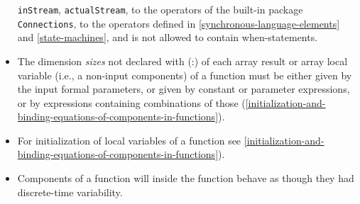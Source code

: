 \begin{itemize}
	\lstinline!inStream!, \lstinline!actualStream!,
  to the operators of the built-in package \lstinline!Connections!, to the operators
  defined in \cref{synchronous-language-elements} and \cref{state-machines}, and is not allowed to contain
  when-statements.
\item
  The dimension \emph{sizes} not declared with (:) of each array result
  or array local variable (i.e., a non-input components) of a
  function must be either given by the input formal parameters, or given
  by constant or parameter expressions, or by expressions containing
  combinations of those (\cref{initialization-and-binding-equations-of-components-in-functions}).
\item
  For initialization of local variables of a function see \cref{initialization-and-binding-equations-of-components-in-functions}).
\item
  Components of a function will inside the function behave as though
  they had discrete-time variability.
\end{itemize}

